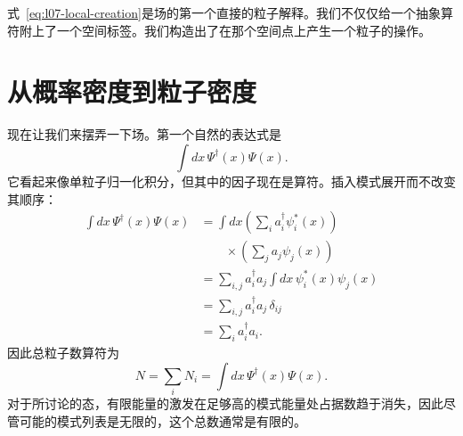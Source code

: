 \begin{classroomqa}
\end{classroomqa}

式~\eqref{eq:l07-local-creation}是场的第一个直接的粒子解释。我们不仅仅给一个抽象算符附上了一个空间标签。我们构造出了在那个空间点上产生一个粒子的操作。

\begin{classroomqa}
\end{classroomqa}

\begin{classroomqa}
\end{classroomqa}

\section{从概率密度到粒子密度}

现在让我们来摆弄一下场。第一个自然的表达式是
\begin{equation}
\int dx\,\Psi^\dagger(x)\Psi(x).
\end{equation}
它看起来像单粒子归一化积分，但其中的因子现在是算符。插入模式展开而不改变其顺序：
\begin{align}
\int dx\,\Psi^\dagger(x)\Psi(x)
&=\int dx
\left(\sum_i a_i^\dagger\psi_i^*(x)\right)\\
&\qquad\times\left(\sum_j a_j\psi_j(x)\right) \\
&=\sum_{i,j}a_i^\dagger a_j
\int dx\,\psi_i^*(x)\psi_j(x) \\
&=\sum_{i,j}a_i^\dagger a_j\,\delta_{ij} \\
&=\sum_i a_i^\dagger a_i.
\label{eq:l07-number-derivation}
\end{align}
因此总粒子数算符为
\begin{equation}
N=\sum_i N_i
=\int dx\,\Psi^\dagger(x)\Psi(x).
\label{eq:l07-total-number}
\end{equation}
对于所讨论的态，有限能量的激发在足够高的模式能量处占据数趋于消失，因此尽管可能的模式列表是无限的，这个总数通常是有限的。

